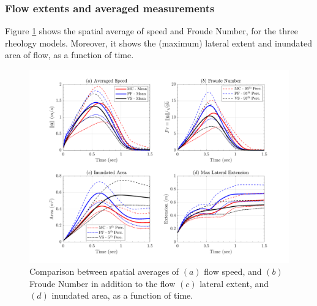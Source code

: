 \documentclass{article}
\begin{document}
\subsubsection{Flow extents and averaged measurements}
Figure \ref{fig:Ramp-spatial} shows the spatial average of speed and Froude Number, for the three rheology models. Moreover, it shows the (maximum) lateral extent and inundated area of flow, as a function of time.
\begin{figure}[H]
        \centering
        \includegraphics[width=1\textwidth]{InclinedPlane/AveragedMeasurments/Averaged_MeasuresIncline.png}
        \caption{Comparison between spatial averages of $(a)$ flow speed, and $(b)$ Froude Number in addition to the flow $(c)$ lateral extent, and $(d)$ inundated area, as a function of time.}
        \label{fig:Ramp-spatial}
\end{figure}
\end{document}
